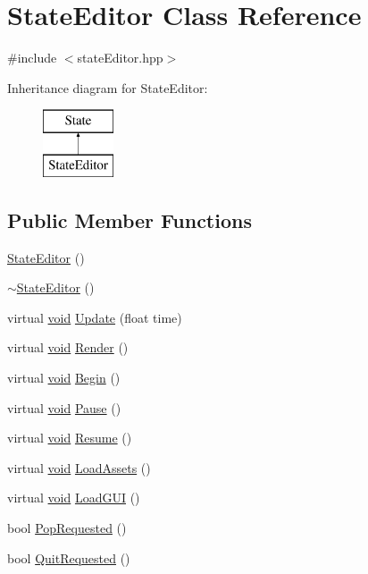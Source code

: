 \hypertarget{class_state_editor}{\section{State\-Editor Class Reference}
\label{class_state_editor}
}


{\ttfamily \#include $<$state\-Editor.\-hpp$>$}

Inheritance diagram for State\-Editor\-:\begin{figure}[H]
\begin{center}
\leavevmode
\includegraphics[height=2.000000cm]{class_state_editor}
\end{center}
\end{figure}
\subsection*{Public Member Functions}
\begin{DoxyCompactItemize}
\item 
\hyperlink{class_state_editor_a263454623b291b8171eebc5889445b5e}{State\-Editor} ()
\item 
\hyperlink{class_state_editor_a160e01512099183107b651c44a0d1410}{$\sim$\-State\-Editor} ()
\item 
virtual \hyperlink{_s_d_l__opengles2__gl2ext_8h_ae5d8fa23ad07c48bb609509eae494c95}{void} \hyperlink{class_state_editor_a9446b67f8a03ec57ba9d7226a2d1d3f2}{Update} (float time)
\item 
virtual \hyperlink{_s_d_l__opengles2__gl2ext_8h_ae5d8fa23ad07c48bb609509eae494c95}{void} \hyperlink{class_state_editor_a9246837b2af58c5fe769b8b0f0bbf5b9}{Render} ()
\item 
virtual \hyperlink{_s_d_l__opengles2__gl2ext_8h_ae5d8fa23ad07c48bb609509eae494c95}{void} \hyperlink{class_state_editor_a677d6795d38aabde9c507fefb08853f3}{Begin} ()
\item 
virtual \hyperlink{_s_d_l__opengles2__gl2ext_8h_ae5d8fa23ad07c48bb609509eae494c95}{void} \hyperlink{class_state_editor_a2d65105b815216bf9d81e02d9edef729}{Pause} ()
\item 
virtual \hyperlink{_s_d_l__opengles2__gl2ext_8h_ae5d8fa23ad07c48bb609509eae494c95}{void} \hyperlink{class_state_editor_af29ad722e62abb7f2268749c28de6221}{Resume} ()
\item 
virtual \hyperlink{_s_d_l__opengles2__gl2ext_8h_ae5d8fa23ad07c48bb609509eae494c95}{void} \hyperlink{class_state_editor_a98d3c7a143dbc80aa453d3d4a13873de}{Load\-Assets} ()
\item 
virtual \hyperlink{_s_d_l__opengles2__gl2ext_8h_ae5d8fa23ad07c48bb609509eae494c95}{void} \hyperlink{class_state_editor_abcde29227330049f5428d08b3f4da63c}{Load\-G\-U\-I} ()
\item 
bool \hyperlink{class_state_editor_a4089bbc03de0300a823ce01d70178edc}{Pop\-Requested} ()
\item 
bool \hyperlink{class_state_editor_afaec9a4eb834d1051019078d8c55b95b}{Quit\-Requested} ()
\end{DoxyCompactItemize}
